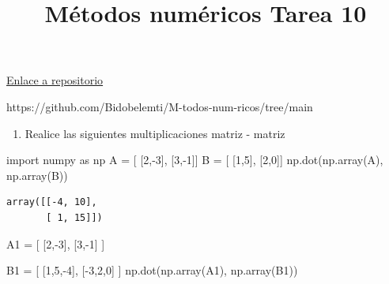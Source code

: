 \documentclass[
  letterpaper,
  DIV=11,
  numbers=noendperiod]{scrartcl}
\title{Métodos numéricos Tarea 10}
\author{}
\date{}
\newenvironment{Shaded}{\begin{snugshade}}{\end{snugshade}}
\newcommand{\DecValTok}[1]{\textcolor[rgb]{0.68,0.00,0.00}{#1}}
\newcommand{\ImportTok}[1]{\textcolor[rgb]{0.00,0.46,0.62}{#1}}
\newcommand{\NormalTok}[1]{\textcolor[rgb]{0.00,0.23,0.31}{#1}}
\newcommand{\OperatorTok}[1]{\textcolor[rgb]{0.37,0.37,0.37}{#1}}
\providecommand{\tightlist}{%
  \setlength{\itemsep}{0pt}\setlength{\parskip}{0pt}}\usepackage{longtable,booktabs,array}
\begin{document}
\maketitle

\href{https://github.com/Bidobelemti/M-todos-num-ricos/tree/main}{Enlace
a repositorio}

https://github.com/Bidobelemti/M-todos-num-ricos/tree/main

\begin{enumerate}
\def\labelenumi{\arabic{enumi}.}
\tightlist
\item
  Realice las siguientes multiplicaciones matriz - matriz
\end{enumerate}

\begin{Shaded}
\begin{Highlighting}[]
\ImportTok{import}\NormalTok{ numpy }\ImportTok{as}\NormalTok{ np}
\NormalTok{A }\OperatorTok{=}\NormalTok{ [}
\NormalTok{    [}\DecValTok{2}\NormalTok{,}\OperatorTok{{-}}\DecValTok{3}\NormalTok{],}
\NormalTok{    [}\DecValTok{3}\NormalTok{,}\OperatorTok{{-}}\DecValTok{1}\NormalTok{]]}
\NormalTok{B }\OperatorTok{=}\NormalTok{ [}
\NormalTok{    [}\DecValTok{1}\NormalTok{,}\DecValTok{5}\NormalTok{],}
\NormalTok{    [}\DecValTok{2}\NormalTok{,}\DecValTok{0}\NormalTok{]]}
\NormalTok{np.dot(np.array(A), np.array(B))}
\end{Highlighting}
\end{Shaded}

\begin{verbatim}
array([[-4, 10],
       [ 1, 15]])
\end{verbatim}

\begin{Shaded}
\begin{Highlighting}[]
\NormalTok{A1 }\OperatorTok{=}\NormalTok{ [}
\NormalTok{    [}\DecValTok{2}\NormalTok{,}\OperatorTok{{-}}\DecValTok{3}\NormalTok{],}
\NormalTok{    [}\DecValTok{3}\NormalTok{,}\OperatorTok{{-}}\DecValTok{1}\NormalTok{]}
\NormalTok{]}

\NormalTok{B1 }\OperatorTok{=}\NormalTok{ [}
\NormalTok{    [}\DecValTok{1}\NormalTok{,}\DecValTok{5}\NormalTok{,}\OperatorTok{{-}}\DecValTok{4}\NormalTok{],}
\NormalTok{    [}\OperatorTok{{-}}\DecValTok{3}\NormalTok{,}\DecValTok{2}\NormalTok{,}\DecValTok{0}\NormalTok{]}
\NormalTok{]}
\NormalTok{np.dot(np.array(A1), np.array(B1))}
\end{Highlighting}
\end{Shaded}
\end{document}
